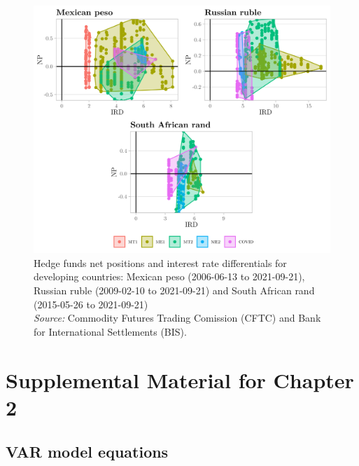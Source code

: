 \documentclass[a4paper, twoside]{templates/ociamthesis}
\begin{document}
\begin{figure}[!ht]

{\centering \includegraphics[width=0.99\columnwidth]{figure/OTHERCUR2_HF} 

}

\caption[Hedge funds net positions and interest rate differentials for developing countries: Mexican peso (2006-06-13 to 2021-09-21), Russian ruble (2009-02-10 to 2021-09-21) and South African rand (2015-05-26 to 2021-09-21)]{Hedge funds net positions and interest rate differentials for developing countries: Mexican peso (2006-06-13 to 2021-09-21), Russian ruble (2009-02-10 to 2021-09-21) and South African rand (2015-05-26 to 2021-09-21) \\ \scriptsize \textit{Source:} Commodity Futures Trading Comission (CFTC) and Bank for International Settlements (BIS).}\label{fig:FigureA39}
\end{figure}

\clearpage

\hypertarget{appendixb}{%
\chapter{Supplemental Material for Chapter 2}\label{appendixb}}

\hypertarget{appendixb1}{%
\section{VAR model equations}\label{appendixb1}}
\end{document}
